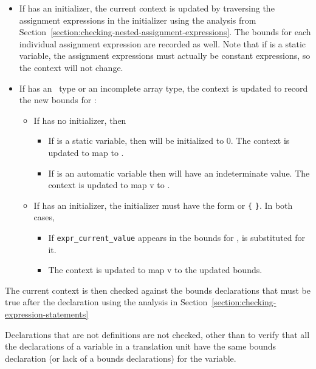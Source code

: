 \begin{itemize}
\item
  If  has an initializer, the current context is updated by
  traversing the assignment expressions in the initializer using the
  analysis from Section~\ref{section:checking-nested-assignment-expressions}. 
  The bounds for each individual assignment
  expression are recorded as well. Note that if  is a static
  variable, the assignment expressions must actually be constant
  expressions, so the context will not change.
\item
  If  has an \arrayptr\ type or an incomplete array
  type, the context is updated to record the new bounds for :

  \begin{itemize}
  \item
    If  has no initializer, then

    \begin{itemize}
    \item
      If  is a static variable, then  will be
      initialized to 0. The context is updated to map  to
      \boundsany.
    \item
      If  is an automatic variable then  will have an
      indeterminate value. The context is updated to map v to
      \boundsnone.
    \end{itemize}
  \item
    If  has an initializer, the initializer must have the form
     or \texttt{\{}  \texttt{\}}. In both cases,

    \begin{itemize}
    \item
      If \texttt{expr\_current\_value} appears in the bounds for
      ,  is substituted for it.
    \item
      The context is updated to map v to the updated bounds.
    \end{itemize}
  \end{itemize}
\end{itemize}

The current context is then checked against the bounds declarations that
must be true after the declaration using the analysis in 
Section~\ref{section:checking-expression-statements}

Declarations that are not definitions are not checked, other than to
verify that all the declarations of a variable in a translation unit
have the same bounds declaration (or lack of a bounds declarations) for
the variable.

